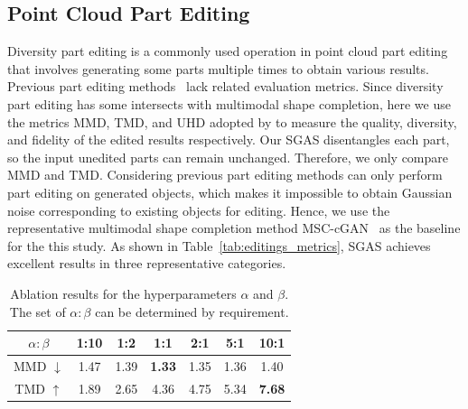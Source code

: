 \documentclass[letterpaper]{article} %
\begin{document}
\subsection{Point Cloud Part Editing}

Diversity part editing is a commonly used operation in point cloud part editing that involves generating some parts multiple times to obtain various results. Previous part editing methods~\citep{Li_Niu_Xu_2020,Gal_2021_ICCV,li2021spgan,Li_Liu_Walder_2022} lack related evaluation metrics. Since diversity part editing has some intersects with multimodal shape completion, here we use the metrics MMD, TMD, and UHD adopted by \citet{wu2020multimodal} to measure the quality, diversity, and fidelity of the edited results respectively. Our SGAS disentangles each part, so the input unedited parts can remain unchanged. Therefore, we only compare MMD and TMD. Considering previous part editing methods can only perform part editing on generated objects, which makes it impossible to obtain Gaussian noise corresponding to existing objects for editing. Hence, we use the representative multimodal shape completion method MSC-cGAN~\citep{wu2020multimodal} as the baseline for the this study. As shown in Table~\ref{tab:editings_metrics}, SGAS achieves excellent results in three representative categories.

\begin{table}[htb]
    \small
    \centering
    \caption{Ablation results for the hyperparameters $\alpha$ and $\beta$. The set of $\alpha:\beta$ can be determined by requirement.}
    \label{tab:ablation_alpha_beta}
    \begin{tabular}{c *6c}
        \toprule
        $\alpha:\beta$ & 1:10 & 1:2 & 1:1 & 2:1 & 5:1 & 10:1 \\
        \midrule
        MMD $\downarrow$ & 1.47 & 1.39 & \textbf{1.33} & 1.35 & 1.36 & 1.40 \\
        \midrule
        TMD $\uparrow$ & 1.89 & 2.65 & 4.36 & 4.75 & 5.34 & \textbf{7.68} \\
        \bottomrule
    \end{tabular}
\end{table}
\end{document}
